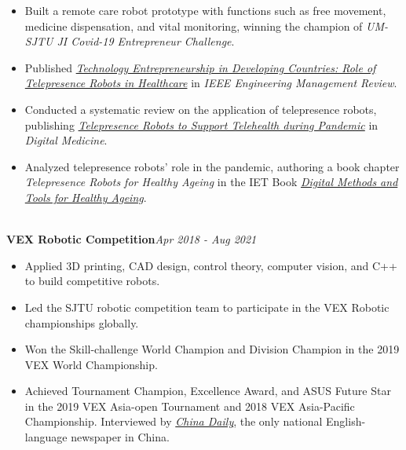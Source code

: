 \documentclass[10pt,a4paper]{article}
\begin{document}
\begin{itemize}[noitemsep,topsep=0pt]
    \item Built a remote care robot prototype with functions such as free movement, medicine dispensation, and vital monitoring, winning the champion of \emph{UM-SJTU JI Covid-19 Entrepreneur Challenge}.
    \item Published \href{https://ieeexplore.ieee.org/document/9330532}{\emph{Technology Entrepreneurship in Developing Countries: Role of Telepresence Robots in Healthcare}} in \emph{IEEE Engineering Management Review}.
    \item Conducted a systematic review on the application of telepresence robots, publishing \href{https://journals.lww.com/dm/fulltext/2022/08010/Telepresence_robots_to_support_telehealth_during.30.aspx}{\emph{Telepresence Robots to Support Telehealth during Pandemic}} in \emph{Digital Medicine}.
    \item Analyzed telepresence robots' role in the pandemic, authoring a book chapter \emph{Telepresence Robots for Healthy Ageing} in the IET Book \href{https://shop.theiet.org/digital-tools-and-methods-to-support-healthy-ageing}{\emph{Digital Methods and Tools for Healthy Ageing}}.
\end{itemize}
\noindent\\
\textbf{VEX Robotic Competition}\hfill\emph{Apr 2018 - Aug 2021}
\begin{itemize}[noitemsep,topsep=0pt]
    \item Applied 3D printing, CAD design, control theory, computer vision, and C++ to build competitive robots.
    \item Led the SJTU robotic competition team to participate in the VEX Robotic championships globally.
    \item Won the Skill-challenge World Champion and Division Champion in the 2019 VEX World Championship.
    \item Achieved Tournament Champion, Excellence Award, and ASUS Future Star in the 2019 VEX Asia-open Tournament and 2018 VEX Asia-Pacific Championship. Interviewed by \href{https://www.chinadaily.com.cn/a/201902/25/WS5c73ea69a3106c65c34eb502.html}{\emph{China Daily}}, the only national English-language newspaper in China.
\end{itemize}
\end{document}
